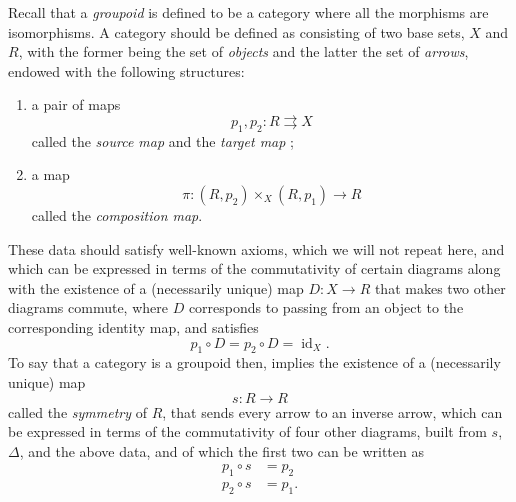 \documentclass{article}
\providecommand{\tightlist}{%
  \setlength{\itemsep}{0pt}\setlength{\parskip}{0pt}}
\newcommand{\oldpage}[1]{\marginpar{\footnotesize$\Big\vert$ \textit{p.~#1}}}
\theoremstyle{definition}
\theoremstyle{definition}
\theoremstyle{definition}
\theoremstyle{definition}
\theoremstyle{remark}
\begin{document}
Recall that a \emph{groupoid} is defined to be a category where all the morphisms are isomorphisms.
\oldpage{212-08}A category should be defined as consisting of two base sets, \(X\) and \(R\), with the former being the set of \emph{objects} and the latter the set of \emph{arrows}, endowed with the following structures:

\begin{enumerate}
\def\labelenumi{\roman{enumi}.}
\tightlist
\item
  a pair of maps
  \[
   p_1,p_2\colon R\rightrightarrows X
    \]
  called the \emph{source map} and the \emph{target map} ;
\item
  a map
  \[
  \pi\colon(R,p_2)\times_X(R,p_1) \to R
    \]
  called the \emph{composition map}.
\end{enumerate}

These data should satisfy well-known axioms, which we will not repeat here, and which can be expressed in terms of the commutativity of certain diagrams along with the existence of a (necessarily unique) map \(D\colon X\to R\) that makes two other diagrams commute, where \(D\) corresponds to passing from an object to the corresponding identity map, and satisfies
\[
  p_1\circ D = p_2\circ D = \operatorname{id}_X.
\]
To say that a category is a groupoid then, implies the existence of a (necessarily unique) map
\[
  s\colon R\to R
\]
called the \emph{symmetry} of \(R\), that sends every arrow to an inverse arrow, which can be expressed in terms of the commutativity of four other diagrams, built from \(s\), \(\Delta\), and the above data, and of which the first two can be written as
\[
  \begin{aligned}
    p_1\circ s &= p_2
  \\p_2\circ s &= p_1.
  \end{aligned}
\]
\end{document}
